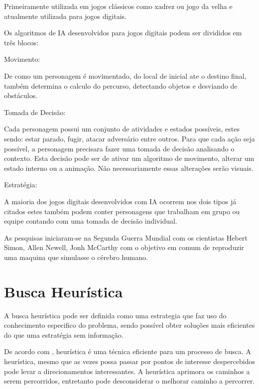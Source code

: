 Primeiramente utilizada em jogos clássicos como xadrez ou jogo da velha e atualmente utilizada para jogos digitais.


Os algoritmos de IA desenvolvidos para jogos digitais podem ser divididos em três blocos:

\begin{alineascomponto}
	
\item Movimento:

De como um personagem é movimentado, do local de inicial ate o destino final, também determina o calculo do percurso, detectando objetos e desviando de obstáculos.
   
 \item Tomada de Decisão:
 
Cada personagem possui um conjunto de atividades e estados possíveis, estes sendo: estar parado, fugir, atacar adversário entre outros. Para que cada ação seja possível, a personagem precisara fazer uma tomada de decisão analisando o contexto. Esta decisão pode ser de ativar um algoritmo de movimento, alterar um estado interno ou a animação. Não necessariamente essas alterações serão visuais.

\item Estratégia:

A maioria dos jogos digitais desenvolvidos com IA ocorrem nos dois tipos já citados estes também podem conter personagens que trabalham em grupo ou equipe contando com uma tomada de decisão individual.

	\end{alineascomponto}

	
As pesquisas iniciaram-se na Segunda Guerra Mundial com os cientistas Hebert Simon, Allen Newell,  Jonh McCarthy com o objetivo em comum de reproduzir uma maquina que simulasse o cérebro humano. \cite{ia}

\section{Busca Heurística}
\label{sec:Busca-Heurística}

A busca heurística pode ser definida como uma estrategia que faz uso do conhecimento especifico do problema, sendo possível obter soluções mais eficientes do que uma estratégia sem informação. \cite{rus}

De acordo com \cite{el}, heurística é uma técnica eficiente para um processo de busca. A heurística, mesmo que as vezes possa passar por pontos de interesse despercebidos pode levar a direcionamentos interessantes. A heurística aprimora os caminhos a serem percorridos, entretanto pode desconsiderar o melhorar caminho a percorrer. 

